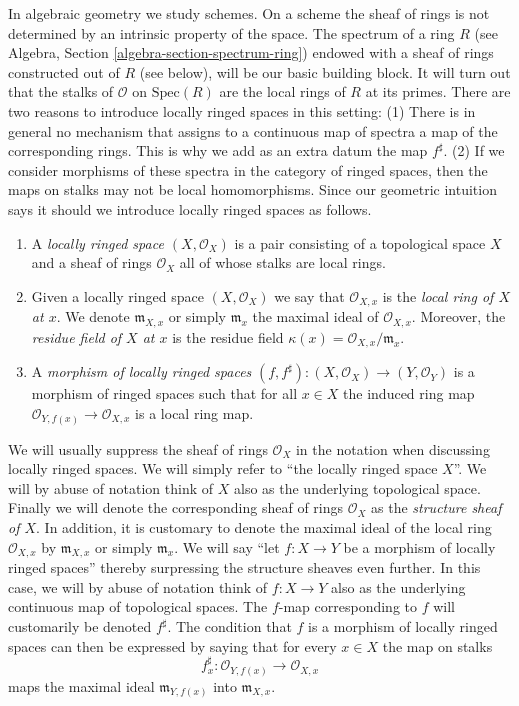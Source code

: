 \medskip\noindent
In algebraic geometry we study schemes. On a scheme the sheaf of rings
is not determined by an intrinsic property of the space.
The spectrum of a ring $R$
(see Algebra, Section \ref{algebra-section-spectrum-ring}) endowed
with a sheaf of rings constructed out of $R$ (see below),
will be our basic building block. It will turn out that
the stalks of $\mathcal{O}$ on $\text{Spec}(R)$ are the local
rings of $R$ at its primes. There are two reasons to introduce
locally ringed spaces in this setting: (1) There is in general
no mechanism that assigns to a continuous map of spectra a
map of the corresponding rings. This is why we add as an extra datum
the map $f^\sharp$. (2) If we consider morphisms
of these spectra in the category of ringed spaces, then the
maps on stalks may not be local homomorphisms. Since our
geometric intuition says it should we introduce locally ringed spaces
as follows.

\begin{definition}
\label{definition-locally-ringed-space}
\begin{enumerate}
\item A {\it locally ringed space $(X, \mathcal{O}_X)$}
is a pair consisting of a
topological space $X$ and a sheaf of rings $\mathcal{O}_X$ all of whose stalks
are local rings.
\item Given a locally ringed space $(X, \mathcal{O}_X)$ we say that
$\mathcal{O}_{X, x}$ is the {\it local ring of $X$ at $x$}.
We denote $\mathfrak{m}_{X, x}$ or simply $\mathfrak{m}_x$
the maximal ideal of $\mathcal{O}_{X, x}$. Moreover, the
{\it residue field of $X$ at $x$} is the residue field
$\kappa(x) = \mathcal{O}_{X, x}/\mathfrak{m}_x$.
\item A {\it morphism of locally ringed spaces}
$(f, f^\sharp) : (X, \mathcal{O}_X) \to (Y, \mathcal{O}_Y)$
is a morphism of ringed spaces such that for all $x \in X$
the induced ring map $\mathcal{O}_{Y, f(x)} \to \mathcal{O}_{X, x}$ is a
local ring map.
\end{enumerate}
\end{definition}

\noindent
We will usually suppress the sheaf of rings $\mathcal{O}_X$
in the notation when discussing locally ringed spaces. We will
simply refer to ``the locally ringed space $X$''.
We will by abuse of notation think of $X$ also as
the underlying topological space. Finally we will denote
the corresponding sheaf of rings
$\mathcal{O}_X$ as the {\it structure sheaf of $X$}.
In addition, it is customary to denote the maximal ideal
of the local ring $\mathcal{O}_{X, x}$ by
$\mathfrak{m}_{X, x}$ or simply $\mathfrak{m}_x$.
We will say ``let $f : X \to Y$ be a morphism of locally ringed
spaces'' thereby surpressing the structure sheaves even further.
In this case, we will by abuse of notation think of $f : X\to Y$
also as the underlying continuous map of topological spaces.
The $f$-map corresponding to $f$ will customarily
be denoted $f^\sharp$. The condition that $f$ is a morphism
of locally ringed spaces can then be expressed by saying that
for every $x\in X$ the map on stalks
$$
f^\sharp_x : \mathcal{O}_{Y, f(x)} \longrightarrow \mathcal{O}_{X, x}
$$
maps the maximal ideal $\mathfrak m_{Y, f(x)}$ into
$\mathfrak m_{X, x}$.

